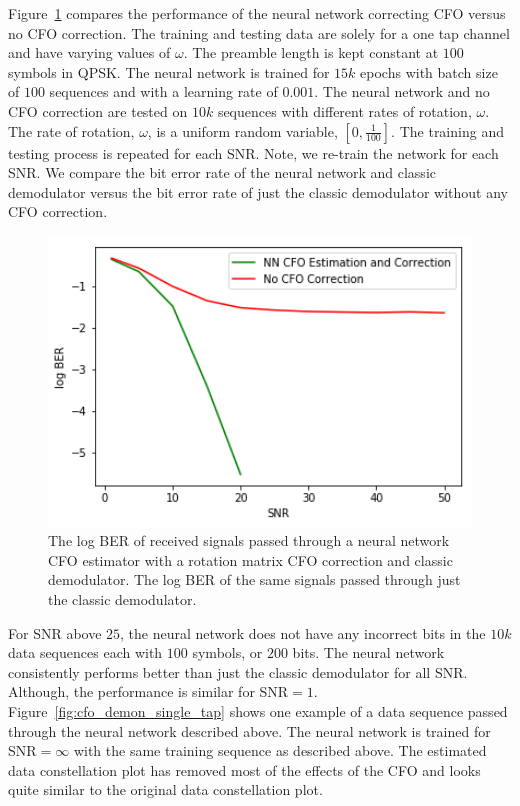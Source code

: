 Figure~\ref{fig:cfo_est} compares the performance of the neural network correcting CFO versus no CFO correction.  The training and testing data are solely for a one tap channel and have varying values of $\omega$. The preamble length is kept constant at $100$ symbols in QPSK.
The neural network is trained for $15k$ epochs with batch size of $100$ sequences and with a learning rate of $0.001$.  The neural network and no CFO correction are tested on $10k$ sequences with different rates of rotation, $\omega$.  
The rate of rotation, $\omega$, is a uniform random variable, $[0,\frac{1}{100}]$.
The training and testing process is repeated for each SNR.  Note, we re-train the network for each SNR.  
We compare the bit error rate of the neural network and classic demodulator versus the bit error rate of just the classic demodulator without any CFO correction.

\begin{figure}
\begin{center}
\includegraphics[width=12cm]{figures/cfo/cfo_estimation.png}
\caption{The log BER of received signals passed through a neural network CFO estimator with a rotation matrix CFO correction and classic demodulator. The log BER of the same signals passed through just the classic demodulator.}
\label{fig:cfo_est}
\end{center}
\end{figure}

For SNR above $25$, the neural network does not have any incorrect bits in the $10k$ data sequences each with $100$ symbols, or $200$ bits.  The neural network consistently performs better than just the classic demodulator for all SNR.  Although, the performance is similar for SNR$=1$.
Figure~\ref{fig:cfo_demon_single_tap} shows one example of a data sequence passed through the neural network described above.
The neural network is trained for SNR$=\infty$ with the same training sequence as described above. The estimated data constellation plot has removed most of the effects of the CFO and looks quite similar to the original data constellation plot.

